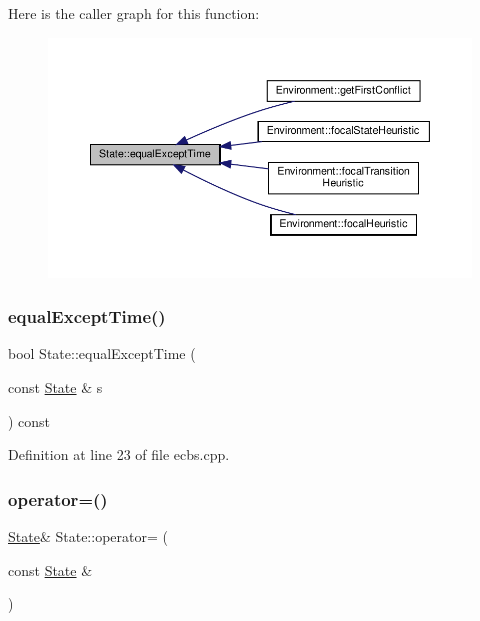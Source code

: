 Here is the caller graph for this function\+:
\nopagebreak
\begin{figure}[H]
\begin{center}
\leavevmode
\includegraphics[width=350pt]{struct_state_a6d429325c836ad81fd1d95eec0051663_icgraph}
\end{center}
\end{figure}
\mbox{\label{struct_state_a6d429325c836ad81fd1d95eec0051663}} 
\subsubsection{\texorpdfstring{equal\+Except\+Time()}{equalExceptTime()}\hspace{0.1cm}{\footnotesize\ttfamily [2/2]}}
{\footnotesize\ttfamily bool State\+::equal\+Except\+Time (\begin{DoxyParamCaption}\item[{const \hyperlink{struct_state}{State} \&}]{s }\end{DoxyParamCaption}) const\hspace{0.3cm}{\ttfamily [inline]}}



Definition at line 23 of file ecbs.\+cpp.

\mbox{\label{struct_state_a0c83d166ff2b6603a8e11c58d867e76f}} 
\subsubsection{\texorpdfstring{operator=()}{operator=()}\hspace{0.1cm}{\footnotesize\ttfamily [1/4]}}
{\footnotesize\ttfamily \hyperlink{struct_state}{State}\& State\+::operator= (\begin{DoxyParamCaption}\item[{const \hyperlink{struct_state}{State} \&}]{ }\end{DoxyParamCaption})\hspace{0.3cm}{\ttfamily [default]}}


